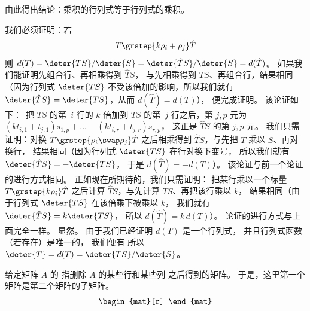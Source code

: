 \begin{exercises}
\begin{exparts}
      \partsitem 由此得出结论：乘积的行列式等于行列式的乘积。
    \end{exparts}
    \begin{answer}
      \begin{exparts}
        \partsitem 我们必须证明：若
          \begin{equation*}
            T\grstep{k\rho_i+\rho_j}\hat{T}
          \end{equation*}
          则 $d(T)=\deter{TS}/\deter{S}
          =\deter{\hat{T}S}/\deter{S}=d(\hat{T})$。
          如果我们能证明先组合行、再相乘得到 \( \hat{T}S \)，
          与先相乘得到 \( TS \)、再组合行，结果相同
          （因为行列式 \( \deter{TS} \) 不受该倍加的影响，所以我们就有
          \( \deter{\hat{T}S}=\deter{TS} \)，从而 \( d(\hat{T})=d(T) \)），
          便完成证明。
          该论证如下：~把 \( TS \) 的第~\( i \) 行的 \( k \) 倍加到
          \( TS \) 的第~$j$ 行之后，第 \( j,p \) 元为
          \( (kt_{i,1}+t_{j,1})s_{1,p}+\dots+(kt_{i,r}+t_{j,r})s_{r,p} \)，
          这正是 \( \hat{T}S \) 的第 \( j,p \) 元。
        \partsitem 我们只需证明：对换
          $
            T\smash[b]{\grstep{\rho_i\swap\rho_j}}\hat{T}
          $
          之后相乘得到 \( \hat{T}S \)，与先把 \( T \) 乘以 \( S \)、再对换行，
          结果相同（因为行列式 \( \deter{TS} \) 在行对换下变号，
         所以我们就有 \( \deter{\hat{T}S}=-\deter{TS} \)，
          于是 \( d(\hat{T})=-d(T) \)）。
          该论证与前一个论证的进行方式相同。
        \partsitem 正如现在所期待的，我们只需证明：
          把某行乘以一个标量
          $
            T\smash[b]{\grstep{k\rho_i}}\hat{T}
          $
          之后计算 \( \hat{T}S \)，与先计算 \( TS \)、再把该行乘以 \( k \)，
          结果相同（由于行列式 \( \deter{TS} \) 在该倍乘下被乘以 \( k \)，
          我们就有 \( \deter{\hat{T}S}=k\deter{TS} \)，
          所以 \( d(\hat{T})=k\,d(T) \)）。
          论证的进行方式与上面完全一样。
        \partsitem 显然。
        \partsitem 由于我们已经证明 \( d(T) \) 是一个行列式，
          并且行列式函数（若存在）是唯一的，
          我们便有
          所以 \( \deter{T}=d(T)=\deter{TS}/\deter{S} \)。
      \end{exparts}  
    \end{answer}
  \item 
    给定矩阵 $A$ 的 
    指删除 $A$ 的某些行和某些列
    之后得到的矩阵。
    于是，这里第一个矩阵是第二个矩阵的子矩阵。
    \begin{equation*}
      \begin{mat}[r]

\end{mat}
\end{equation*}
\end{exercises}
